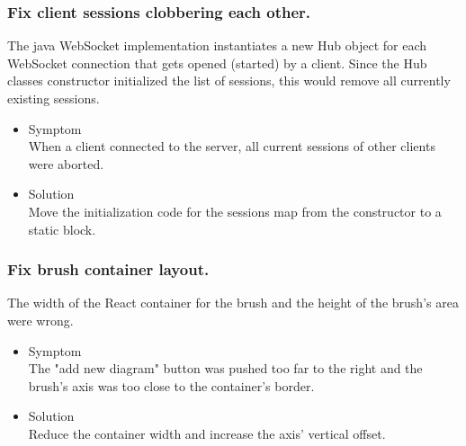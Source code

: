 \documentclass[oneside, english, final]{design}
\begin{document}
\subsubsection{Fix client sessions clobbering each other.}

The java WebSocket implementation instantiates a new Hub object for each WebSocket connection that gets opened (started) by a client. Since the Hub classes constructor initialized the list of sessions, this would remove all currently existing sessions.

\begin{itemize}
      \item{Symptom
            \\
            When a client connected to the server, all current sessions of other clients were aborted.
	}
      \item{Solution
            \\
            Move the initialization code for the sessions map from the constructor to a static block.
            }
\end{itemize}
\subsubsection{Fix brush container layout.}

The width of the React container for the brush and the height of the brush's area were wrong.

\begin{itemize}
      \item{Symptom
            \\
            The "add new diagram" button was pushed too far to the right and the brush's axis was too close to the container's border.
	}
      \item{Solution
            \\
            Reduce the container width and increase the axis' vertical offset.
            }
\end{itemize}


\newpage
\end{document}
